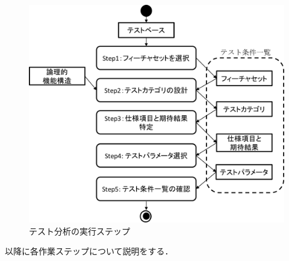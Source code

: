 \begin{figure}[htbp]
  \begin{center}
  \includegraphics[width=12cm]{./image/D-2-FigStep.png}
  \caption{テスト分析の実行ステップ}
  \label{fig:D-2-FigStep}
  \end{center}
   \end{figure}


以降に各作業ステップについて説明をする．

